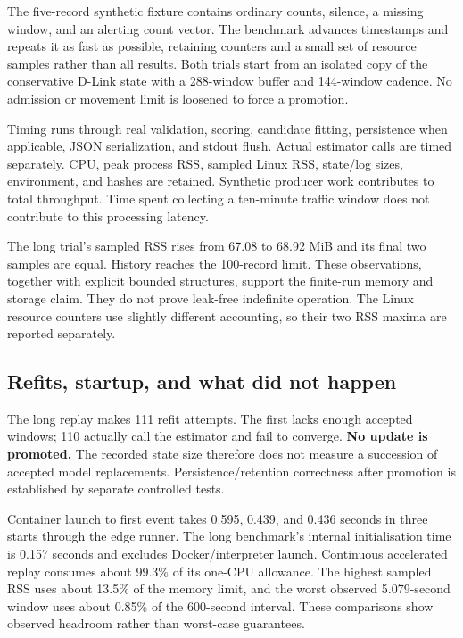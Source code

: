 The five-record synthetic fixture contains ordinary counts, silence, a missing
window, and an alerting count vector. The benchmark advances timestamps and
repeats it as fast as possible, retaining counters and a small set of resource
samples rather than all results. Both trials start from an isolated copy of
the conservative D-Link state with a 288-window buffer and 144-window cadence.
No admission or movement limit is loosened to force a promotion.

Timing runs through real validation, scoring, candidate fitting, persistence
when applicable, JSON serialization, and stdout flush. Actual estimator calls
are timed separately. CPU, peak process RSS, sampled Linux RSS, state/log sizes,
environment, and hashes are retained. Synthetic producer work contributes to
total throughput. Time spent collecting a ten-minute traffic window does not
contribute to this processing latency.



The long trial's sampled RSS rises from 67.08 to 68.92 MiB and its final two
samples are equal. History reaches the 100-record limit. These observations,
together with explicit bounded structures, support the finite-run memory and
storage claim. They do not prove leak-free indefinite operation. The Linux
resource counters use slightly different accounting, so their two RSS maxima
are reported separately.

\subsection{Refits, startup, and what did not happen}

The long replay makes 111 refit attempts. The first lacks enough accepted
windows; 110 actually call the estimator and fail to converge.
\textbf{No update is promoted.} The recorded state size therefore does not
measure a succession of accepted model replacements. Persistence/retention
correctness after promotion is established by separate controlled tests.

Container launch to first event takes 0.595, 0.439, and 0.436 seconds in three
starts through the edge runner. The long benchmark's internal initialisation
time is 0.157 seconds and excludes Docker/interpreter launch.
Continuous accelerated replay consumes about 99.3\% of its one-CPU allowance.
The highest sampled RSS uses about 13.5\% of the memory limit, and the worst
observed 5.079-second window uses about 0.85\% of the 600-second interval.
These comparisons show observed headroom rather than worst-case guarantees.

